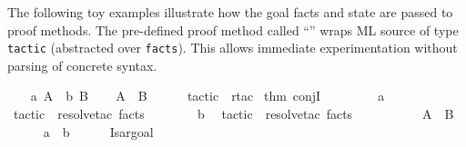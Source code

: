 \begin{isabellebody}
\begin{isamarkuptext}
  \medskip The following toy examples illustrate how the goal facts
  and state are passed to proof methods.  The pre-defined proof method
  called ``\hyperlink{method.tactic}{\mbox{}}'' wraps ML source of type \verb|tactic| (abstracted over \verb|facts|).  This allows immediate
  experimentation without parsing of concrete syntax.%
\end{isamarkuptext}%
\isamarkuptrue%
%
\endisatagmlex
{\isafoldmlex}%
%
\isadelimmlex
%
\endisadelimmlex
{}\isamarkupfalse%
\isanewline
{}\isanewline
%
\isadelimproof
\ \ %
\endisadelimproof
%
\isatagproof
{}\isamarkupfalse%
\ a{}\ A\ \ b{}\ B\isanewline
\isanewline
\ \ \isamarkupfalse%
\ {}A\ {}\ B{}\isanewline
\ \ \ \ \isamarkupfalse%
\ {}tactic\ {}\ rtac\ %
\isaantiq
thm\ conjI{}%
\endisaantiq
\ {}\ {}{}\isanewline
\ \ \ \ \isamarkupfalse%
\ a\ \isamarkupfalse%
\ {}tactic\ {}\ resolve{}tac\ facts\ {}\ {}{}\isanewline
\ \ \ \ \isamarkupfalse%
\ b\ \isamarkupfalse%
\ {}tactic\ {}\ resolve{}tac\ facts\ {}\ {}{}\isanewline
\ \ \ \ \isamarkupfalse%
\isanewline
\isanewline
\ \ \isamarkupfalse%
\ {}A\ {}\ B{}\isanewline
\ \ \ \ \isamarkupfalse%
\ a\ \ b%
\endisatagproof
{\isafoldproof}%
%
\isadelimproof
\isanewline
%
\endisadelimproof
%
\isadelimML
\ \ \ \ %
\endisadelimML
%
\isatagML
{}\isamarkupfalse%
\ {}{}{}Isar{}goal{}{}%

\end{isabellebody}
